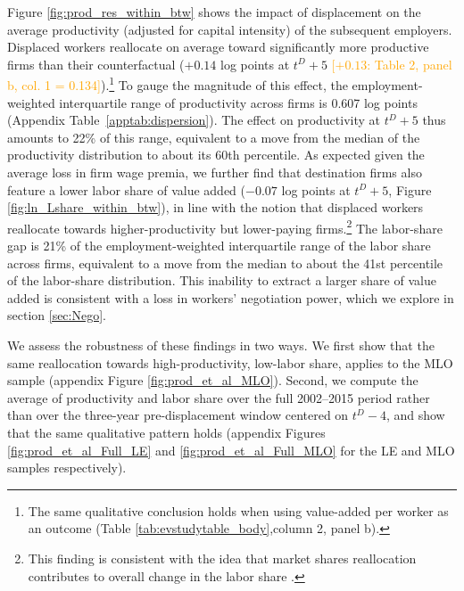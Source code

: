 Figure \ref{fig:prod_res_within_btw} shows the impact of displacement on the average productivity (adjusted for capital intensity) of the subsequent employers.  %
Displaced workers reallocate on average toward significantly more productive firms than their counterfactual ($+0.14$ log points at $t^D+5$ \textcolor{orange}{[$+0.13$: Table 2, panel b, col. 1 = 0.134]}).\footnote{The same qualitative conclusion holds when using value-added per worker as an outcome (Table \ref{tab:evstudytable_body},column 2, panel b).} To gauge the magnitude of this effect, the employment-weighted interquartile range of productivity across firms is 0.607 log points (Appendix Table~\ref{apptab:dispersion}). The effect on productivity at $t^D+5$ thus amounts to 22\% of this range, equivalent to a move from the median of the productivity distribution to about its 60th percentile. As expected given the average loss in firm wage premia, we further find that destination firms also feature a lower labor share of value added ($-0.07$ log points at $t^D+5$, Figure \ref{fig:ln_Lshare_within_btw}), in line with the notion that displaced workers reallocate towards higher-productivity but lower-paying firms.\footnote{This finding is consistent with the idea that market shares reallocation contributes to overall change in the labor share \citep{autor2020fall,aghion2022theory}.} The labor-share gap is 21\% of the employment-weighted interquartile range of the labor share across firms, equivalent to a move from the median to about the 41st percentile of the labor-share distribution. This inability to extract a larger share of value added is consistent with a loss in workers' negotiation power, which we explore in section \ref{sec:Nego}.

We assess the robustness of these findings in two ways. We first show that the same reallocation towards high-productivity, low-labor share, applies to the MLO sample (appendix Figure \ref{fig:prod_et_al_MLO}). Second, we compute the average of productivity and labor share over the full 2002--2015 period rather than over the three-year pre-displacement window centered on $t^D-4$, and show that the same qualitative pattern holds (appendix Figures \ref{fig:prod_et_al_Full_LE} and \ref{fig:prod_et_al_Full_MLO} for the LE and MLO samples respectively).

